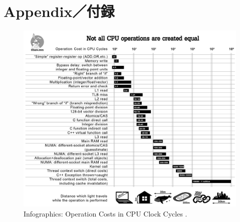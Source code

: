 \chapter*{Appendix／付録} %


\setcounter{section}{0} %
\renewcommand{\thesection}{\Alph{section}} %
\setcounter{equation}{0} %
\renewcommand{\theequation}{\Alph{section}.\arabic{equation}}
\setcounter{figure}{0} %
\renewcommand{\thefigure}{\Alph{section}.\arabic{figure}}
\setcounter{table}{0} %
\renewcommand{\thetable}{\Alph{section}.\arabic{table}}

\begin{figure} %
  \centering
  \includegraphics[width=17.25cm]{./fig/part101_infographics_v08.png}
  \caption{
    Infographics: Operation Costs in CPU Clock Cycles \citep{NoBugsHare2016}.
  }
  \label{fig_part101_infographics}
\end{figure}



